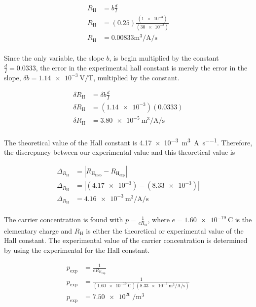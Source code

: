 \documentclass[a4paper]{article}
\begin{document}
\begin{align*}
  R_{\text{H}} &= b \frac{d}{I} \\
  R_{\text{H}} &= (0.25) \frac{(\num{1e-3})}{(\num{30e-3})} \\
  R_{\text{H}} &= \num{0.00833}\si{\cubic\meter\per\ampere\per\second} \\
\end{align*}

\qq Since the only variable, the slope \( b \), is begin multiplied by the constant
\( \frac{d}{I} = \num{0.0333} \), the error in the experimental hall constant is
merely the error in the slope, \( \delta b = \SI{1.14e-3}{\volt\per\tesla} \),
multiplied by the constant.

\begin{align*}
  \delta R_{\text{H}} &= \delta b \frac{d}{I} \\
  \delta R_{\text{H}} &= (\num{1.14e-3}) (\num{0.0333}) \\
  \delta R_{\text{H}} &= \SI{3.80e-5}{\cubic\meter\per\ampere\per\second} \\
\end{align*}

\qq The theoretical value of the Hall constant is
\SI{4.17e-3}{\cubic\meter\per\ampere\per\second}. Therefore, the discrepancy
between our experimental value and this theoretical value is

\begin{align*}
  \Delta_{R_{\text{H}}} &= | R_{\text{H}_{\text{theo}}} - R_{\text{H}_{\text{exp}}} | \\
  \Delta_{R_{\text{H}}} &= | (\num{4.17e-3}) - (\num{8.33e-3}) | \\
  \Delta_{R_{\text{H}}} &= \SI{4.16e-3}{\cubic\meter\per\ampere\per\second} \\
\end{align*}

\qq The carrier concentration is found with \( p =
\frac{1}{\si{\elementarycharge} R_{\text{H}}} \), where \(
\si{\elementarycharge} = \SI{1.60e-19}{\coulomb} \) is the elementary charge and
\( R_{\text{H}} \) is either the theoretical or experimental value of the Hall constant.
The experimental value of the carrier concentration is determined by using the
experimental for the Hall constant.

\begin{align*}
  p_{\text{exp}} &= \frac{1}{\si{\elementarycharge} R_{\text{H}_{\text{exp}}}}
  \\
  p_{\text{exp}} &= \frac{1}{(\SI{1.60e-19}{\coulomb})
      (\SI{8.33e-3}{\cubic\meter\per\ampere\per\second})} \\
  p_{\text{exp}} &= \SI{7.50e20}{\per\cubic\meter} \\
\end{align*}
\end{document}
